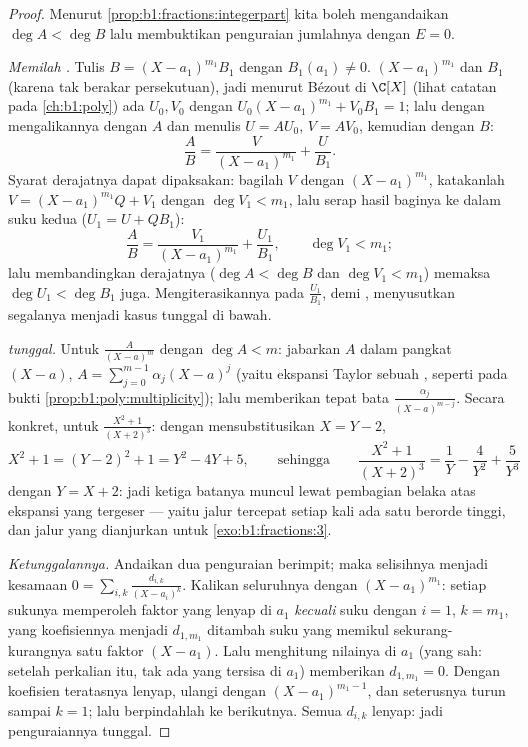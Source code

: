 \begin{proof}
Menurut \cref{prop:b1:fractions:integerpart} kita boleh mengandaikan $\deg A < \deg
B$ lalu membuktikan penguraian jumlahnya dengan $E = 0$.

\emph{Memilah .} Tulis $B = (X - a_1)^{m_1} B_1$ dengan
$B_1(a_1) \neq 0$.  $(X-a_1)^{m_1}$ dan $B_1$  (karena tak berakar persekutuan), jadi menurut Bézout di $\C[X]$ (lihat catatan pada
\cref{ch:b1:poly}) ada $U_0, V_0$ dengan $U_0 (X-a_1)^{m_1} +
V_0 B_1 = 1$; lalu dengan mengalikannya dengan $A$ dan menulis $U = AU_0$, $V =
AV_0$, kemudian  dengan $B$:
\[
\frac AB = \frac{V}{(X - a_1)^{m_1}} + \frac{U}{B_1} .
\]
Syarat derajatnya dapat dipaksakan: bagilah $V$ dengan
$(X-a_1)^{m_1}$, katakanlah $V = (X-a_1)^{m_1}Q + V_1$ dengan $\deg V_1 <
m_1$, lalu serap hasil baginya ke dalam suku kedua ($U_1 = U +
QB_1$):
\[
\frac AB = \frac{V_1}{(X - a_1)^{m_1}} + \frac{U_1}{B_1},
\qquad \deg V_1 < m_1 ;
\]
lalu membandingkan derajatnya ($\deg A < \deg B$ dan $\deg V_1 < m_1$) memaksa
$\deg U_1 < \deg B_1$ juga. Mengiterasikannya pada $\frac{U_1}{B_1}$,
 demi , menyusutkan segalanya menjadi kasus  tunggal di bawah.

\emph{ tunggal.} Untuk $\frac{A}{(X-a)^m}$ dengan $\deg A < m$: jabarkan $A$
dalam pangkat $(X - a)$, $A = \sum_{j=0}^{m-1} \alpha_j (X - a)^j$
(yaitu ekspansi Taylor sebuah , seperti pada bukti
\cref{prop:b1:poly:multiplicity}); lalu  memberikan tepat bata
$\frac{\alpha_j}{(X-a)^{m-j}}$. Secara konkret, untuk $\frac{X^2 +
1}{(X+2)^3}$: dengan mensubstitusikan $X = Y - 2$,
\[
X^2 + 1 = (Y - 2)^2 + 1 = Y^2 - 4Y + 5 ,
\qquad\text{sehingga}\qquad
\frac{X^2+1}{(X+2)^3} = \frac1{Y} - \frac4{Y^2} + \frac5{Y^3}
\]
dengan $Y = X + 2$: jadi ketiga batanya muncul lewat pembagian belaka atas
ekspansi yang tergeser --- yaitu jalur tercepat setiap kali ada satu
 berorde tinggi, dan jalur yang dianjurkan untuk
\cref{exo:b1:fractions:3}.

\emph{Ketunggalannya.} Andaikan dua penguraian berimpit; maka
selisihnya menjadi kesamaan $0 = \sum_{i,k} \frac{d_{i,k}}{(X -
a_i)^k}$. Kalikan seluruhnya dengan $(X - a_1)^{m_1}$: setiap sukunya
memperoleh faktor yang lenyap di $a_1$ \emph{kecuali} suku dengan
$i = 1$, $k = m_1$, yang koefisiennya menjadi $d_{1,m_1}$ ditambah
suku yang memikul sekurang-kurangnya satu faktor $(X - a_1)$. Lalu menghitung nilainya di
$a_1$ (yang sah: setelah perkalian itu, tak ada  yang tersisa di
$a_1$) memberikan $d_{1,m_1} = 0$. Dengan koefisien teratasnya lenyap,
ulangi dengan $(X - a_1)^{m_1 - 1}$, dan seterusnya turun sampai $k = 1$;
lalu berpindahlah ke  berikutnya. Semua $d_{i,k}$ lenyap: jadi
penguraiannya tunggal.
\end{proof}

